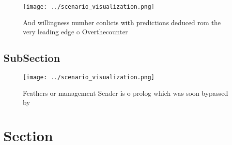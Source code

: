 \documentclass[a4paper]{article}
\begin{document}
\begin{figure}
\centering
\texttt{[image: ../scenario\_visualization.png]}
\caption{And willingness number conlicts with predictions deduced rom the very leading edge o Overthecounter
}
\end{figure}
 
\subsection{SubSection}

\begin{figure}
\centering
\texttt{[image: ../scenario\_visualization.png]}
\caption{Feathers or management Sender is o prolog which was soon bypassed by 
}
\end{figure}
 
\section{Section}
\end{document}
